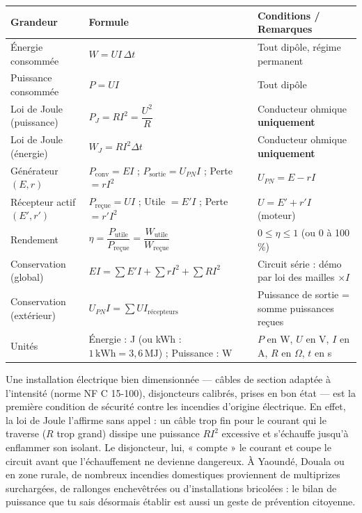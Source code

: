 \documentclass[11pt]{article}
\begin{document}
\begin{aretenir}
\begin{center}
\begin{tabularx}{\linewidth}{|l|X|X|}
\hline
\rowcolor{popblueL} \textbf{Grandeur} & \textbf{Formule} & \textbf{Conditions / Remarques} \\
\hline
Énergie consommée & $W = UI\,\Delta t$ & Tout dipôle, régime permanent \\
\hline
Puissance consommée & $P = UI$ & Tout dipôle \\
\hline
Loi de Joule (puissance) & $P_J = RI^2 = \dfrac{U^2}{R}$ & Conducteur ohmique \textbf{uniquement} \\
\hline
Loi de Joule (énergie) & $W_J = RI^2\Delta t$ & Conducteur ohmique \textbf{uniquement} \\
\hline
Générateur $(E,r)$ & $P_{\text{conv}} = EI$ ; $P_{\text{sortie}} = U_{PN}I$ ; Perte $= rI^2$ & $U_{PN} = E - rI$ \\
\hline
Récepteur actif $(E',r')$ & $P_{\text{reçue}} = UI$ ; Utile $= E'I$ ; Perte $= r'I^2$ & $U = E' + r'I$ (moteur) \\
\hline
Rendement & $\eta = \dfrac{P_{\text{utile}}}{P_{\text{reçue}}} = \dfrac{W_{\text{utile}}}{W_{\text{reçue}}}$ & $0 \leq \eta \leq 1$ (ou 0 à 100 \%) \\
\hline
Conservation (global) & $EI = \sum E'I + \sum rI^2 + \sum RI^2$ & Circuit série : démo par loi des mailles $\times I$ \\
\hline
Conservation (extérieur) & $U_{PN}I = \sum UI_{\text{récepteurs}}$ & Puissance de sortie = somme puissances reçues \\
\hline
Unités & Énergie : J (ou kWh : $1\,\text{kWh}=3,6\,\text{MJ}$) ; Puissance : W & $P$ en W, $U$ en V, $I$ en A, $R$ en $\Omega$, $t$ en s \\
\hline
\end{tabularx}
\end{center}
\end{aretenir}

\begin{savaistu}
Une installation électrique bien dimensionnée — câbles de section adaptée à l'intensité (norme NF C 15-100), disjoncteurs calibrés, prises en bon état — est la première condition de sécurité contre les incendies d'origine électrique. En effet, la loi de Joule l'affirme sans appel : un câble trop fin pour le courant qui le traverse ($R$ trop grand) dissipe une puissance $RI^2$ excessive et s'échauffe jusqu'à enflammer son isolant. Le disjoncteur, lui, « compte » le courant et coupe le circuit avant que l'échauffement ne devienne dangereux. À Yaoundé, Douala ou en zone rurale, de nombreux incendies domestiques proviennent de multiprizes surchargées, de rallonges enchevêtrées ou d'installations bricolées : le bilan de puissance que tu sais désormais établir est aussi un geste de prévention citoyenne.
\end{savaistu}
\end{document}
